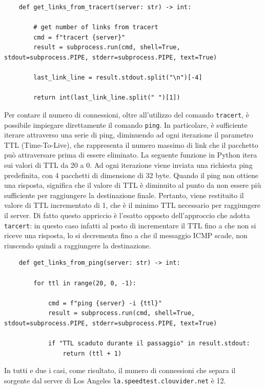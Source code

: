 \begin{lstlisting}
    def get_links_from_tracert(server: str) -> int:

        # get number of links from tracert
        cmd = f"tracert {server}"
        result = subprocess.run(cmd, shell=True, stdout=subprocess.PIPE, stderr=subprocess.PIPE, text=True)

        last_link_line = result.stdout.split("\n")[-4]

        return int(last_link_line.split(" ")[1])
\end{lstlisting}

\noindent Per contare il numero di connessioni, oltre all'utilizzo del comando \texttt{tracert}, è possibile impiegare direttamente il comando \texttt{ping}. In particolare, è sufficiente iterare attraverso una serie di ping, diminuendo ad ogni iterazione il parametro TTL (Time-To-Live), che rappresenta il numero massimo di link che il pacchetto può attraversare prima di essere eliminato. La seguente funzione in Python itera sui valori di TTL da 20 a 0. Ad ogni iterazione viene inviata una richiesta ping predefinita, con 4 pacchetti di dimensione di 32 byte. Quando il ping non ottiene una risposta, significa che il valore di TTL è diminuito al punto da non essere più sufficiente per raggiungere la destinazione finale. Pertanto, viene restituito il valore di TTL incrementato di 1, che è il minimo TTL necessario per raggiungere il server. Di fatto questo appriccio è l'esatto opposto dell'approccio che adotta \texttt{tarcert}: in questo caso infatti al posto di incrementare il TTL fino a che non si riceve una risposta, lo si decrementa fino a che il messaggio ICMP scade, non riuscendo quindi a raggiungere la destinazione.

\begin{lstlisting}
    def get_links_from_ping(server: str) -> int:

        for ttl in range(20, 0, -1):

            cmd = f"ping {server} -i {ttl}"
            result = subprocess.run(cmd, shell=True, stdout=subprocess.PIPE, stderr=subprocess.PIPE, text=True)

            if "TTL scaduto durante il passaggio" in result.stdout:
                return (ttl + 1)
\end{lstlisting}

\noindent In tutti e due i casi, come risultato, il numero di connessioni che separa il sorgente dal server di Los Angeles \texttt{la.speedtest.clouvider.net} è 12.


